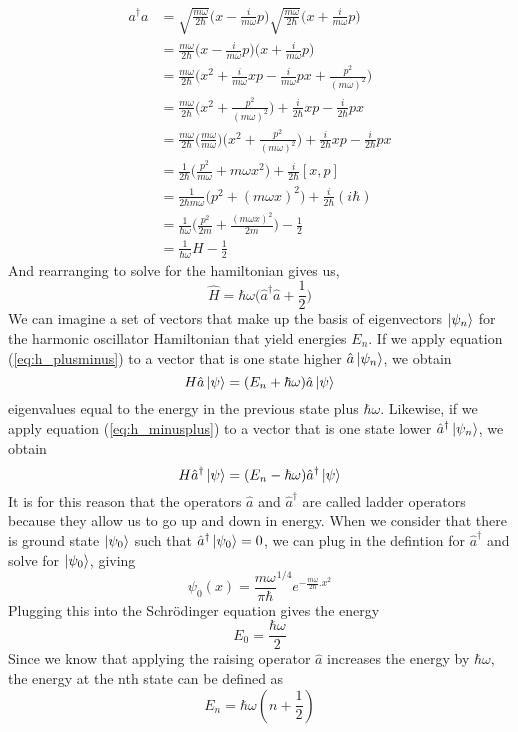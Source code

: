 \documentclass{article}
\newcommand{\be}{\begin{equation}}
\newcommand{\ee}{\end{equation}}
\begin{document}
\be
  \begin{split}
    a^{\dagger}a &= \sqrt{\frac{m \omega}{2 \hbar}} \Big( x - \frac{i}{m \omega} p\Big) \sqrt{\frac{m \omega}{2 \hbar}} \Big( x + \frac{i}{m \omega} p\Big) \\
    &= \frac{m \omega}{2 \hbar} \Big( x - \frac{i}{m \omega} p\Big) \Big( x + \frac{i}{m \omega} p\Big) \\
    &= \frac{m \omega}{2 \hbar} \Big( x^2 + \frac{i}{m \omega}xp - \frac{i}{m \omega}px + \frac{p^2}{(m \omega)^2}\Big) \\
    &= \frac{m \omega}{2 \hbar} \Big( x^2 + \frac{p^2}{(m \omega)^2}\Big) + \frac{i}{2 \hbar}xp - \frac{i}{2 \hbar}px \\
    &= \frac{m \omega}{2 \hbar} \Big( \frac{m \omega}{m \omega} \Big) \Big( x^2 + \frac{p^2}{(m \omega)^2}\Big) + \frac{i}{2 \hbar}xp - \frac{i}{2 \hbar}px \\
    &= \frac{1}{2 \hbar} \Big( \frac{p^2}{m \omega} + m \omega x^2 \Big) + \frac{i}{2 \hbar} [x,p] \\
    &= \frac{1}{2 \hbar m \omega} \Big( p^2 + (m \omega x)^2 \Big) + \frac{i}{2 \hbar} (i \hbar) \\
    &= \frac{1}{\hbar \omega} \Big( \frac{p^2}{2m} + \frac{(m \omega x)^2}{2m} \Big) - \frac{1}{2} \\
    &= \frac{1}{\hbar \omega}H - \frac{1}{2}
  \end{split}
\ee
And rearranging to solve for the hamiltonian gives us,
\be \label{eq:h_minusplus}
  \hat{H} = \hbar \omega \Big(\hat{a}^{\dagger} \hat{a} + \frac{1}{2} \Big)
\ee
We can imagine a set of vectors that make up the basis of eigenvectors $\ket{\psi_n}$ for the harmonic oscillator Hamiltonian that yield energies $E_n$.
If we apply equation (\ref{eq:h_plusminus}) to a vector that is one state higher $\hat{a}\ket{\psi_n}$, we obtain
\be
  H \hat{a}\ket{\psi} = (E_n + \hbar \omega) \hat{a}\ket{\psi}
\ee
eigenvalues equal to the energy in the previous state plus $\hbar \omega$.
Likewise, if we apply equation (\ref{eq:h_minusplus}) to a vector that is one state lower $\hat{a}^{\dagger}\ket{\psi_n}$, we obtain
\be
  H \hat{a}^{\dagger}\ket{\psi} = (E_n - \hbar \omega) \hat{a}^{\dagger}\ket{\psi}
\ee
It is for this reason that the operators $\hat{a}$ and $\hat{a}^{\dagger}$ are called ladder operators because they allow us to go up and down in energy.\cite{griffiths,shankar}
When we consider that there is ground state $\ket{\psi_0}$ such that $\hat{a}^{\dagger}\ket{\psi_0} = 0$, we can plug in the defintion for $\hat{a}^{\dagger}$ and solve for $\ket{\psi_0}$, giving
\be
  \psi_0(x) = \frac{m \omega}{\pi \hbar}^{1/4} e^{-\frac{m \omega}{2 \hbar} . x^2}
\ee
Plugging this into the Schr\"odinger equation gives the energy
\be
  E_0 = \frac{\hbar \omega}{2}
\ee
Since we know that applying the raising operator $\hat{a}$ increases the energy by $\hbar \omega$, the energy at the nth state can be defined as
\be
  E_n = \hbar \omega(n + \frac{1}{2})
\ee
\end{document}
